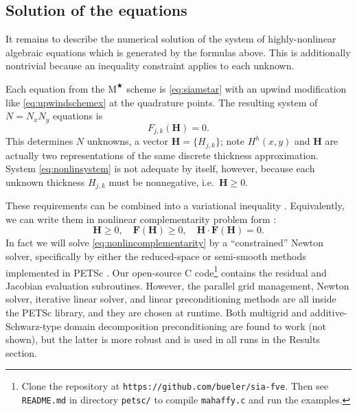 \documentclass[review,letterpaper]{igs}
\newcommand\bF{\mathbf{F}}
\newcommand\bH{\mathbf{H}}
\newcommand{\Mstar}{$\text{M}^{\bigstar}$\xspace}
\begin{document}
\subsection{Solution of the equations}

It remains to describe the numerical solution of the system of highly-nonlinear algebraic equations which is generated by the formulas above.  This is additionally nontrivial because an inequality constraint applies to each unknown.

Each equation from the \Mstar scheme is \eqref{eq:siamstar} with an upwind modification like \eqref{eq:upwindschemex} at the quadrature points.  The resulting system of $N=N_x N_y$ equations is
\begin{equation}
F_{j,k}(\bH) = 0.   \label{eq:nonlinsystem}
\end{equation}
This determines $N$ unknowns, a vector $\bH=\{H_{j,k}\}$; note $H^h(x,y)$ and $\bH$ are actually two representations of the same discrete thickness approximation.  System \eqref{eq:nonlinsystem} is not adequate by itself, however, because each unknown thickness $H_{j,k}$ must be nonnegative, i.e.~$\bH \ge 0$.

These requirements can be combined into a variational inequality \citep{JouvetBueler2012,KinderlehrerStampacchia1980}.  Equivalently, we can write them in nonlinear complementarity problem form \citep{BensonMunson2006}:
\begin{equation}
\bH \ge 0, \quad \bF(\bH) \ge 0, \quad \bH \cdot \bF(\bH) = 0.  \label{eq:nonlincomplementarity}
\end{equation}
In fact we will solve \eqref{eq:nonlincomplementarity} by a ``constrained'' Newton solver, specifically by either the reduced-space or semi-smooth methods \citep{BensonMunson2006} implemented in PETSc \citep{Balayetal2014}.  Our open-source C code\footnote{Clone the repository at \texttt{https://github.com/bueler/sia-fve}.  Then see \texttt{README.md} in directory \texttt{petsc/} to compile \texttt{mahaffy.c} and run the examples.} contains the residual and Jacobian evaluation subroutines.  However, the parallel grid management, Newton solver, iterative linear solver, and linear preconditioning methods are all inside the PETSc library, and they are chosen at runtime.  Both multigrid \citep{Briggsetal2000} and additive-Schwarz-type domain decomposition \citep{Smithetal1996} preconditioning are found to work (not shown), but the latter is more robust and is used in all runs in the Results section.
\end{document}
